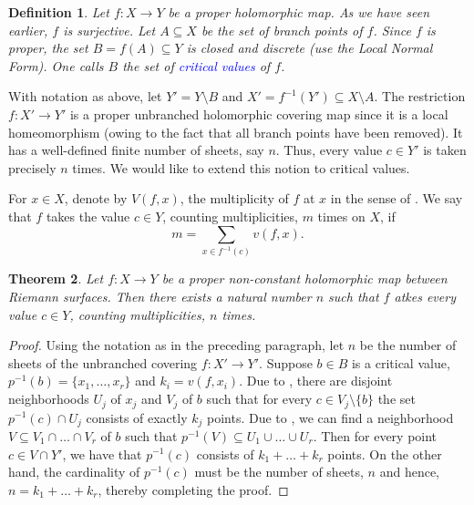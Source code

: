 \documentclass[12pt]{article}
\theoremstyle{thmstyle}
\newtheorem{theorem}{Theorem}[section]
\theoremstyle{defstyle}
\newtheorem{definition}[theorem]{Definition}
\newcommand{\define}[1]{\textcolor{blue}{\textit{#1}}}
\begin{document}
\begin{definition}
    Let $f: X\to Y$ be a proper holomorphic map. As we have seen earlier, $f$ is surjective. Let $A\subseteq X$ be the set of branch points of $f$. Since $f$ is proper, the set $B = f(A)\subseteq Y$ is closed and discrete (use the Local Normal Form). One calls $B$ the set of \define{critical values} of $f$.
\end{definition}

With notation as above, let $Y' = Y\setminus B$ and $X' = f^{-1}(Y')\subseteq X\setminus A$. The restriction $f: X'\to Y'$ is a proper unbranched holomorphic covering map since it is a local homeomorphism (owing to the fact that all branch points have been removed). It has a well-defined finite number of sheets, say $n$. Thus, every value $c\in Y'$ is taken precisely $n$ times. We would like to extend this notion to critical values. 

For $x\in X$, denote by $V(f, x)$, the multiplicity of $f$ at $x$ in the sense of . We say that $f$ takes the value $c\in Y$, counting multiplicities, $m$ times on $X$, if 
\begin{equation*}
    m = \sum_{x\in f^{-1}(c)}v(f, x).
\end{equation*}

\begin{theorem}
    Let $f: X\to Y$ be a proper non-constant holomorphic map between Riemann surfaces. Then there exists a natural number $n$ such that $f$ atkes every value $c\in Y$, counting multiplicities, $n$ times.
\end{theorem}
\begin{proof}
    Using the notation as in the preceding paragraph, let $n$ be the number of sheets of the unbranched covering $f: X'\to Y'$. Suppose $b\in B$ is a critical value, $p^{-1}(b) = \{x_1,\dots, x_r\}$ and $k_i = v(f, x_i)$. Due to , there are disjoint neighborhoods $U_j$ of $x_j$ and $V_j$ of $b$ such that for every $c\in V_j\setminus\{b\}$ the set $p^{-1}(c)\cap U_j$ consists of exactly $k_j$ points. Due to , we can find a neighborhood $V\subseteq V_1\cap\dots\cap V_r$ of $b$ such that $p^{-1}(V)\subseteq U_1\cup\dots\cup U_r$. Then for every point $c\in V\cap Y'$, we have that $p^{-1}(c)$ consists of $k_1 + \dots + k_r$ points. On the other hand, the cardinality of $p^{-1}(c)$ must be the number of sheets, $n$ and hence, $n = k_1 + \dots + k_r$, thereby completing the proof. 
\end{proof}
\end{document}
